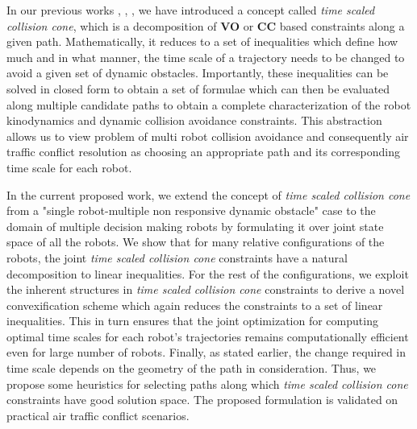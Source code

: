\documentclass[letterpaper, 10 pt, conference]{IEEEtran}  %
\begin{document}
In our previous works \cite{cdc13}, \cite{iros14}, \cite{iros15}, we have introduced a concept called \emph{time scaled collision cone}, which is a decomposition of \textbf{VO} or \textbf{CC} based constraints along a given path. Mathematically, it reduces to a  set of inequalities which define how much and in what manner, the time scale of a trajectory needs to be changed to avoid a given set of dynamic obstacles. Importantly, these inequalities can be solved in closed form to obtain a set of formulae which can then be evaluated along multiple candidate paths to obtain a complete characterization of the robot kinodynamics and dynamic collision avoidance constraints. This abstraction allows us to view problem of  multi robot collision avoidance and consequently air traffic conflict resolution as choosing an appropriate path and its corresponding time scale for each robot.


In the current proposed work, we extend the concept of \emph{time scaled collision cone} from a "single robot-multiple non responsive dynamic obstacle" case to the domain of multiple decision making robots by formulating it  over joint state space of all the robots. We show that for many relative configurations of the robots, the joint \emph{time scaled collision cone} constraints have a natural decomposition to linear inequalities. For the rest of the configurations, we exploit the inherent structures in \emph{time scaled collision cone} constraints to  derive a novel convexification scheme which again reduces  the constraints to a set of linear inequalities. This in turn ensures that the  joint optimization for computing optimal time scales for each robot's trajectories remains computationally efficient  even for large number of  robots. Finally, as stated earlier, the change required in time scale depends on the geometry of the path in consideration. Thus, we propose some heuristics for selecting paths along which \emph{time scaled collision cone}  constraints have good solution space. The proposed formulation is validated on practical air traffic conflict scenarios.
\end{document}
